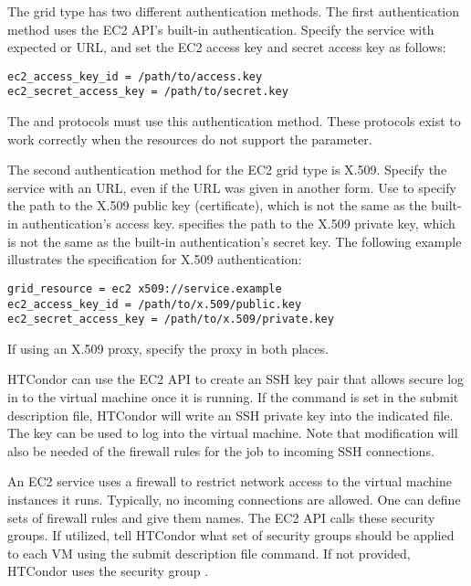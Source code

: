 The  grid type has two different authentication methods.
The first authentication method uses the EC2 API's built-in authentication.
Specify the service with expected  or  URL,
and set the EC2 access key and secret access key as follows:

\begin{verbatim}
ec2_access_key_id = /path/to/access.key
ec2_secret_access_key = /path/to/secret.key
\end{verbatim}

The  and  protocols must use this 
authentication method.
These protocols exist to work correctly when the resources do not support
the  parameter.

The second authentication method for the EC2 grid type is X.509.
Specify the service with an  URL, 
even if the URL was given in another form.  
Use  to 
specify the path to the X.509 public key (certificate),
which is not the same as the built-in authentication's access key.
 specifies the path to the X.509 
private key,
which is not the same as the built-in authentication's secret key.
The following example illustrates the specification for X.509 authentication:

\begin{verbatim}
grid_resource = ec2 x509://service.example
ec2_access_key_id = /path/to/x.509/public.key
ec2_secret_access_key = /path/to/x.509/private.key
\end{verbatim}

If using an X.509 proxy, specify the proxy in both places.

HTCondor can use the EC2 API to create an SSH key pair that allows
secure log in to the virtual machine once it is running.
If the command
is set in the submit description file,
HTCondor will write an SSH private key into the indicated file.
The key can be used to log into the virtual machine.
Note that modification will also be needed of the firewall
rules for the job to incoming SSH connections.

An EC2 service uses a firewall to restrict network access to 
the virtual machine instances it runs.
Typically, no incoming connections are allowed.
One can define sets of firewall rules and give them names.
The EC2 API calls these security groups. 
If utilized, tell HTCondor what set of security
groups should be applied to each VM using the
 submit description file command.
If not provided, HTCondor uses the security group .

